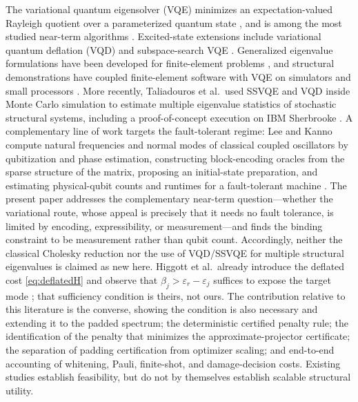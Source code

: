\documentclass{ieeeaccess}
\begin{document}
The variational quantum eigensolver (VQE) minimizes an expectation-valued Rayleigh quotient over a parameterized quantum state \cite{Peruzzo2014,McClean2016}, and is among the most studied near-term algorithms \cite{Preskill2018,Cerezo2021,Tilly2022}. Excited-state extensions include variational quantum deflation (VQD) \cite{Higgott2019} and subspace-search VQE \cite{Nakanishi2019}. Generalized eigenvalue formulations have been developed for finite-element problems \cite{Sato2023}, and structural demonstrations have coupled finite-element software with VQE on simulators and small processors \cite{Liu2024}. More recently, Taliadouros et al.\ used SSVQE and VQD inside Monte Carlo simulation to estimate multiple eigenvalue statistics of stochastic structural systems, including a proof-of-concept execution on IBM Sherbrooke \cite{Taliadouros2025}. A complementary line of work targets the fault-tolerant regime: Lee and Kanno compute natural frequencies and normal modes of classical coupled oscillators by qubitization and phase estimation, constructing block-encoding oracles from the sparse structure of the matrix, proposing an initial-state preparation, and estimating physical-qubit counts and runtimes for a fault-tolerant machine \cite{LeeKanno2025}. The present paper addresses the complementary near-term question---whether the variational route, whose appeal is precisely that it needs no fault tolerance, is limited by encoding, expressibility, or measurement---and finds the binding constraint to be measurement rather than qubit count. Accordingly, neither the classical Cholesky reduction nor the use of VQD/SSVQE for multiple structural eigenvalues is claimed as new here. Higgott et al.\ already introduce the deflated cost \cref{eq:deflatedH} and observe that $\beta_j>\varepsilon_r-\varepsilon_j$ suffices to expose the target mode \cite{Higgott2019}; that sufficiency condition is theirs, not ours. The contribution relative to this literature is the converse, showing the condition is also necessary and extending it to the padded spectrum; the deterministic certified penalty rule; the identification of the penalty that minimizes the approximate-projector certificate; the separation of padding certification from optimizer scaling; and end-to-end accounting of whitening, Pauli, finite-shot, and damage-decision costs. Existing studies establish feasibility, but do not by themselves establish scalable structural utility.
\end{document}
